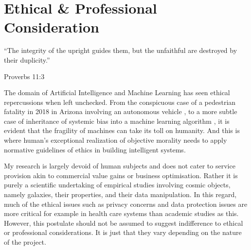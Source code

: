 \section{Ethical \& Professional Consideration}
\epigraph{\justify``The integrity of the upright guides them, but the unfaithful are destroyed by their duplicity.''}{Proverbs 11:3}

The domain of Artificial Intelligence and Machine Learning has seen ethical repercussions when left unchecked. From the conspicuous case of a pedestrian fatality in 2018 in Arizona involving an autonomous vehicle \parencite{wakabayashi_self-driving_2018}, to a more subtle case of inheritance of systemic bias into a machine learning algorithm \parencite{shaw_artificial_2018}, it is evident that the fragility of machines can take its toll on humanity. And this is where human's exceptional realization of objective morality needs to apply normative guidelines of ethics in building intelligent systems.

My research is largely devoid of human subjects and does not cater to service provision akin to commercial value gains or business optimisation. Rather it is purely a scientific undertaking of empirical studies involving cosmic objects, namely galaxies, their properties, and their data manipulation. In this regard, much of the ethical issues such as privacy concerns and data protection issues are more critical for example in health care systems than academic studies as this. However, this postulate should not be assumed to suggest indifference to ethical or professional considerations. It is just that they vary depending on the nature of the project.

